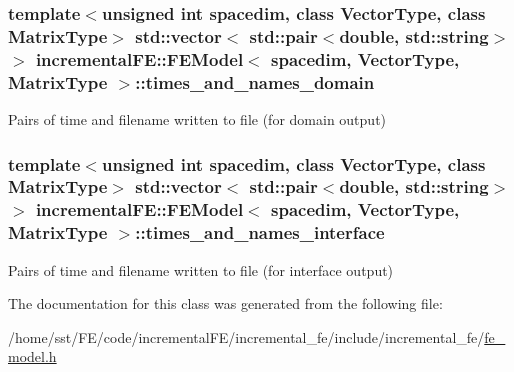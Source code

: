 \subsubsection[{\texorpdfstring{times\+\_\+and\+\_\+names\+\_\+domain}{times_and_names_domain}}]{\setlength{\rightskip}{0pt plus 5cm}template$<$unsigned int spacedim, class Vector\+Type, class Matrix\+Type$>$ std\+::vector$<$ std\+::pair$<$double, std\+::string$>$ $>$ {\bf incremental\+F\+E\+::\+F\+E\+Model}$<$ spacedim, {\bf Vector\+Type}, Matrix\+Type $>$\+::times\+\_\+and\+\_\+names\+\_\+domain\hspace{0.3cm}{\ttfamily [private]}}\hypertarget{classincremental_f_e_1_1_f_e_model_a587711c4f60083ef739f51f315c3dcec}{}\label{classincremental_f_e_1_1_f_e_model_a587711c4f60083ef739f51f315c3dcec}
Pairs of time and filename written to file (for domain output) 
\subsubsection[{\texorpdfstring{times\+\_\+and\+\_\+names\+\_\+interface}{times_and_names_interface}}]{\setlength{\rightskip}{0pt plus 5cm}template$<$unsigned int spacedim, class Vector\+Type, class Matrix\+Type$>$ std\+::vector$<$ std\+::pair$<$double, std\+::string$>$ $>$ {\bf incremental\+F\+E\+::\+F\+E\+Model}$<$ spacedim, {\bf Vector\+Type}, Matrix\+Type $>$\+::times\+\_\+and\+\_\+names\+\_\+interface\hspace{0.3cm}{\ttfamily [private]}}\hypertarget{classincremental_f_e_1_1_f_e_model_a519061ab5d7aaf2f8699b766a88f8712}{}\label{classincremental_f_e_1_1_f_e_model_a519061ab5d7aaf2f8699b766a88f8712}
Pairs of time and filename written to file (for interface output) 

The documentation for this class was generated from the following file\+:\begin{DoxyCompactItemize}
\item 
/home/sst/\+F\+E/code/incremental\+F\+E/incremental\+\_\+fe/include/incremental\+\_\+fe/\hyperlink{fe__model_8h}{fe\+\_\+model.\+h}\end{DoxyCompactItemize}
